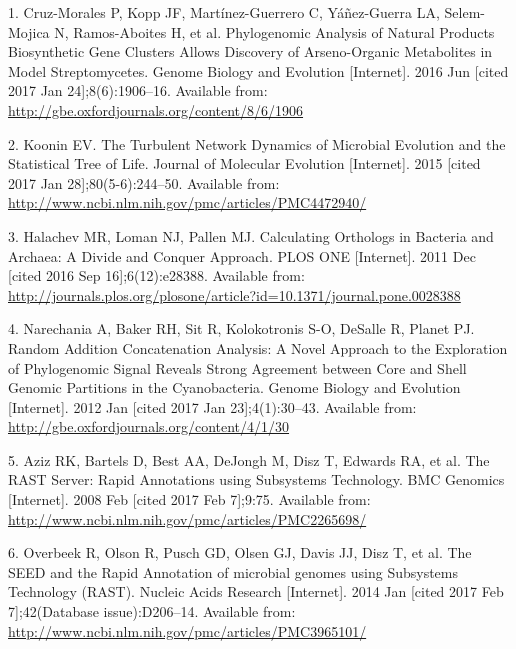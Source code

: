\documentclass[12pt,twoside]{reedthesis}
\begin{document}
  \setlength{\parindent}{-0.20in} \setlength{\leftskip}{0.20in}
  \setlength{\parskip}{8pt}
  
  \hypertarget{refs}{}
  \hypertarget{ref-cruz-morales_phylogenomic_2016}{}
  1. Cruz-Morales P, Kopp JF, Martínez-Guerrero C, Yáñez-Guerra LA,
  Selem-Mojica N, Ramos-Aboites H, et al. Phylogenomic Analysis of Natural
  Products Biosynthetic Gene Clusters Allows Discovery of Arseno-Organic
  Metabolites in Model Streptomycetes. Genome Biology and Evolution
  {[}Internet{]}. 2016 Jun {[}cited 2017 Jan 24{]};8(6):1906--16.
  Available from: \url{http://gbe.oxfordjournals.org/content/8/6/1906}
  
  \hypertarget{ref-koonin_turbulent_2015}{}
  2. Koonin EV. The Turbulent Network Dynamics of Microbial Evolution and
  the Statistical Tree of Life. Journal of Molecular Evolution
  {[}Internet{]}. 2015 {[}cited 2017 Jan 28{]};80(5-6):244--50. Available
  from: \url{http://www.ncbi.nlm.nih.gov/pmc/articles/PMC4472940/}
  
  \hypertarget{ref-halachev_calculating_2011}{}
  3. Halachev MR, Loman NJ, Pallen MJ. Calculating Orthologs in Bacteria
  and Archaea: A Divide and Conquer Approach. PLOS ONE {[}Internet{]}.
  2011 Dec {[}cited 2016 Sep 16{]};6(12):e28388. Available from:
  \url{http://journals.plos.org/plosone/article?id=10.1371/journal.pone.0028388}
  
  \hypertarget{ref-narechania_random_2012}{}
  4. Narechania A, Baker RH, Sit R, Kolokotronis S-O, DeSalle R, Planet
  PJ. Random Addition Concatenation Analysis: A Novel Approach to the
  Exploration of Phylogenomic Signal Reveals Strong Agreement between Core
  and Shell Genomic Partitions in the Cyanobacteria. Genome Biology and
  Evolution {[}Internet{]}. 2012 Jan {[}cited 2017 Jan 23{]};4(1):30--43.
  Available from: \url{http://gbe.oxfordjournals.org/content/4/1/30}
  
  \hypertarget{ref-aziz_rast_2008}{}
  5. Aziz RK, Bartels D, Best AA, DeJongh M, Disz T, Edwards RA, et al.
  The RAST Server: Rapid Annotations using Subsystems Technology. BMC
  Genomics {[}Internet{]}. 2008 Feb {[}cited 2017 Feb 7{]};9:75. Available
  from: \url{http://www.ncbi.nlm.nih.gov/pmc/articles/PMC2265698/}
  
  \hypertarget{ref-overbeek_seed_2014}{}
  6. Overbeek R, Olson R, Pusch GD, Olsen GJ, Davis JJ, Disz T, et al. The
  SEED and the Rapid Annotation of microbial genomes using Subsystems
  Technology (RAST). Nucleic Acids Research {[}Internet{]}. 2014 Jan
  {[}cited 2017 Feb 7{]};42(Database issue):D206--14. Available from:
  \url{http://www.ncbi.nlm.nih.gov/pmc/articles/PMC3965101/}
  
\end{document}

